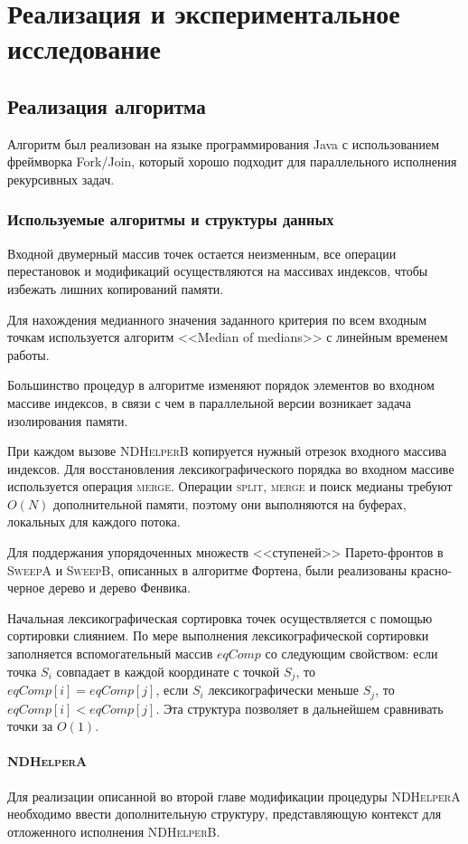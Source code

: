 \chapter{Реализация и экспериментальное исследование}
\section{Реализация алгоритма}
Алгоритм был реализован на языке программирования Java с использованием фреймворка Fork/Join, который хорошо подходит для параллельного исполнения рекурсивных задач.

\subsection{Используемые алгоритмы и структуры данных}
Входной двумерный массив точек остается неизменным, все операции перестановок и модификаций осуществляются на массивах индексов, чтобы избежать лишних копирований памяти.

Для нахождения медианного значения заданного критерия по всем входным точкам используется алгоритм <<Median of medians>> с линейным временем работы.

Большинство процедур в алгоритме изменяют порядок элементов во входном массиве индексов, в связи с чем в параллельной версии возникает задача изолирования памяти.

При каждом вызове \textsc{NDHelperB} копируется нужный отрезок входного массива индексов.
Для восстановления лексикографического порядка во входном массиве используется операция \textsc{merge}.
Операции \textsc{split}, \textsc{merge} и поиск медианы требуют $O(N)$ дополнительной памяти, поэтому они выполняются на буферах, локальных для каждого потока.

Для поддержания упорядоченных множеств <<ступеней>> Парето-фронтов в \textsc{SweepA} и \textsc{SweepB}, описанных в алгоритме Фортена, были реализованы красно-черное дерево и дерево Фенвика.

Начальная лексикографическая сортировка точек осуществляется с помощью сортировки слиянием.
По мере выполнения лексикографической сортировки заполняется вспомогательный массив $eqComp$ со следующим свойством: если точка $S_i$ совпадает в каждой координате с точкой $S_j$, то $eqComp[i] = eqComp[j]$, если $S_i$ лексикографически меньше $S_j$, то $eqComp[i] < eqComp[j]$.
Эта структура позволяет в дальнейшем сравнивать точки за $O(1)$.

\subsubsection{\textsc{NDHelperA}}
Для реализации описанной во второй главе модификации процедуры \textsc{NDHelperA} необходимо ввести дополнительную структуру, представляющую контекст для отложенного исполнения \textsc{NDHelperB}.

